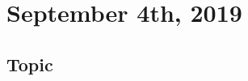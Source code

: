 \documentclass[../main/main.tex]{subfiles}
\begin{document}
\section{September  4th, 2019}
\subsection{Topic}
\end{document}
